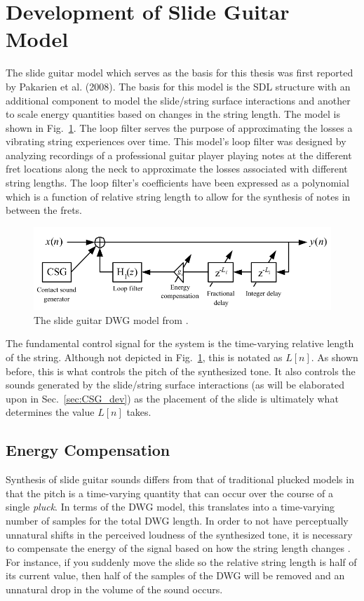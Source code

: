 \documentclass[main.tex]{subfiles}
\begin{document}
\section{Development of Slide Guitar Model}
The slide guitar model which serves as the basis for this thesis was first reported by Pakarien et al. (2008). The basis for this model is the SDL structure with an additional component to model the slide/string surface interactions and another to scale energy quantities based on changes in the string length. The model is shown in Fig.~\ref{fig:original_DWG}. The loop filter serves the purpose of approximating the losses a vibrating string experiences over time. This model's loop filter was designed by analyzing recordings of a professional guitar player playing notes at the different fret locations along the neck to approximate the losses associated with different string lengths. The loop filter's coefficients have been expressed as a polynomial which is a function of relative string length to allow for the synthesis of notes in between the frets.

\begin{figure}[h]
    \centering
    \includegraphics[scale=.75]{./images/pictures/SDL_slide_model.png}
    \caption{The slide guitar DWG model from .}
    \label{fig:original_DWG}
\end{figure}

The fundamental control signal for the system is the time-varying relative length of the string. Although not depicted in Fig.~\ref{fig:original_DWG}, this is notated as $L[n]$. As shown before, this is what controls the pitch of the synthesized tone. It also controls the sounds generated by the slide/string surface interactions (as will be elaborated upon in Sec.~\ref{sec:CSG_dev}) as the placement of the slide is ultimately what determines the value $L[n]$ takes.

\subsection{Energy Compensation}
Synthesis of slide guitar sounds differs from that of traditional plucked models in that the pitch is a time-varying quantity that can occur over the course of a single \emph{pluck}. In terms of the DWG model, this translates into a time-varying number of samples for the total DWG length. In order to not have perceptually unnatural shifts in the perceived loudness of the synthesized tone, it is necessary to compensate the energy of the signal based on how the string length changes . For instance, if you suddenly move the slide so the relative string length is half of its current value, then half of the samples of the DWG will be removed and an unnatural drop in the volume of the sound occurs.
\end{document}
